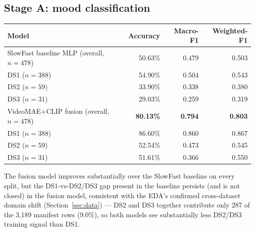 \documentclass[11pt]{article}
\begin{document}
\subsection{Stage A: mood classification}
\begin{center}
\begin{tabular}{@{}lrrr@{}}
\toprule
Model & Accuracy & Macro-F1 & Weighted-F1 \\
\midrule
SlowFast baseline MLP (overall, $n=478$) & 50.63\% & 0.479 & 0.503 \\
\quad DS1 ($n=388$) & 54.90\% & 0.504 & 0.543 \\
\quad DS2 ($n=59$) & 33.90\% & 0.338 & 0.380 \\
\quad DS3 ($n=31$) & 29.03\% & 0.259 & 0.319 \\
\midrule
VideoMAE+CLIP fusion (overall, $n=478$) & \textbf{80.13\%} & \textbf{0.794} & \textbf{0.803} \\
\quad DS1 ($n=388$) & 86.60\% & 0.860 & 0.867 \\
\quad DS2 ($n=59$) & 52.54\% & 0.473 & 0.545 \\
\quad DS3 ($n=31$) & 51.61\% & 0.366 & 0.550 \\
\bottomrule
\end{tabular}
\end{center}
The fusion model improves substantially over the SlowFast baseline on every split, but the
DS1-vs-DS2/DS3 gap present in the baseline persists (and is not closed) in the fusion model,
consistent with the EDA's confirmed cross-dataset domain shift (Section~\ref{sec:data}) --- DS2 and
DS3 together contribute only 287 of the 3{,}189 manifest rows (9.0\%), so both models see
substantially less DS2/DS3 training signal than DS1.
\end{document}
